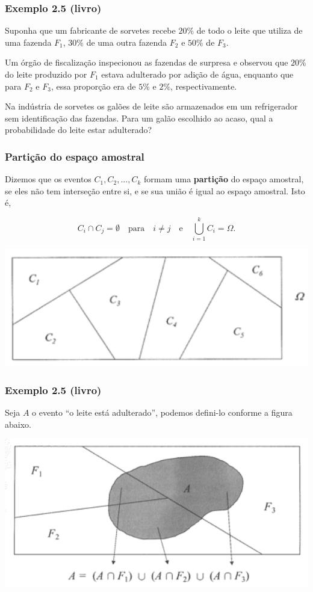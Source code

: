 \documentclass[11pt]{beamer}
\begin{document}
\begin{frame}
\frametitle{Exemplo 2.5 (livro)}

Suponha que um fabricante de sorvetes recebe \(20\%\) de todo o leite
que utiliza de uma fazenda \(F_1\), \(30\%\) de uma outra fazenda
\(F_2\) e \(50\%\) de \(F_3\).

Um órgão de fiscalização inspecionou as fazendas de surpresa e observou
que \(20\%\) do leite produzido por \(F_1\) estava adulterado por adição
de água, enquanto que para \(F_2\) e \(F_3\), essa proporção era de
\(5\%\) e \(2\%\), respectivamente.

Na indústria de sorvetes os galões de leite são armazenados em um
refrigerador sem identificação das fazendas. Para um galão escolhido ao
acaso, qual a probabilidade do leite estar adulterado?
\end{frame}


\begin{frame}
\frametitle{Partição do espaço amostral}

Dizemos que os eventos \(C_1, C_2, ..., C_k\) formam uma
\textbf{partição} do espaço amostral, se eles não tem interseção entre
si, e se sua união é igual ao espaço amostral. Isto é,

\[
C_i \cap C_j = \emptyset \quad \text{para} \quad i \not= j \quad
\text{e} \quad \bigcup_{i=1}^k C_i = \Omega.
\]

\begin{center}\includegraphics[width=0.6\linewidth]{figs/particao} \end{center}
\end{frame}

\begin{frame}
\frametitle{Exemplo 2.5 (livro)}

Seja \(A\) o evento ``o leite está adulterado'', podemos defini-lo
conforme a figura abaixo.


\begin{center}\includegraphics[width=0.6\linewidth]{figs/bayes} \end{center}


\end{frame}
\end{document}
